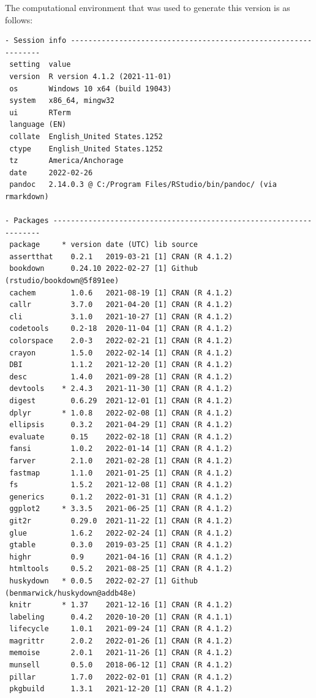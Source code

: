 \documentclass [11pt, proquest] {uwthesis}[2015/03/03]
\begin{document}
The computational environment that was used to generate this version is as follows:
\begin{verbatim}
- Session info ---------------------------------------------------------------
 setting  value
 version  R version 4.1.2 (2021-11-01)
 os       Windows 10 x64 (build 19043)
 system   x86_64, mingw32
 ui       RTerm
 language (EN)
 collate  English_United States.1252
 ctype    English_United States.1252
 tz       America/Anchorage
 date     2022-02-26
 pandoc   2.14.0.3 @ C:/Program Files/RStudio/bin/pandoc/ (via rmarkdown)

- Packages -------------------------------------------------------------------
 package     * version date (UTC) lib source
 assertthat    0.2.1   2019-03-21 [1] CRAN (R 4.1.2)
 bookdown      0.24.10 2022-02-27 [1] Github (rstudio/bookdown@5f891ee)
 cachem        1.0.6   2021-08-19 [1] CRAN (R 4.1.2)
 callr         3.7.0   2021-04-20 [1] CRAN (R 4.1.2)
 cli           3.1.0   2021-10-27 [1] CRAN (R 4.1.2)
 codetools     0.2-18  2020-11-04 [1] CRAN (R 4.1.2)
 colorspace    2.0-3   2022-02-21 [1] CRAN (R 4.1.2)
 crayon        1.5.0   2022-02-14 [1] CRAN (R 4.1.2)
 DBI           1.1.2   2021-12-20 [1] CRAN (R 4.1.2)
 desc          1.4.0   2021-09-28 [1] CRAN (R 4.1.2)
 devtools    * 2.4.3   2021-11-30 [1] CRAN (R 4.1.2)
 digest        0.6.29  2021-12-01 [1] CRAN (R 4.1.2)
 dplyr       * 1.0.8   2022-02-08 [1] CRAN (R 4.1.2)
 ellipsis      0.3.2   2021-04-29 [1] CRAN (R 4.1.2)
 evaluate      0.15    2022-02-18 [1] CRAN (R 4.1.2)
 fansi         1.0.2   2022-01-14 [1] CRAN (R 4.1.2)
 farver        2.1.0   2021-02-28 [1] CRAN (R 4.1.2)
 fastmap       1.1.0   2021-01-25 [1] CRAN (R 4.1.2)
 fs            1.5.2   2021-12-08 [1] CRAN (R 4.1.2)
 generics      0.1.2   2022-01-31 [1] CRAN (R 4.1.2)
 ggplot2     * 3.3.5   2021-06-25 [1] CRAN (R 4.1.2)
 git2r         0.29.0  2021-11-22 [1] CRAN (R 4.1.2)
 glue          1.6.2   2022-02-24 [1] CRAN (R 4.1.2)
 gtable        0.3.0   2019-03-25 [1] CRAN (R 4.1.2)
 highr         0.9     2021-04-16 [1] CRAN (R 4.1.2)
 htmltools     0.5.2   2021-08-25 [1] CRAN (R 4.1.2)
 huskydown   * 0.0.5   2022-02-27 [1] Github (benmarwick/huskydown@addb48e)
 knitr       * 1.37    2021-12-16 [1] CRAN (R 4.1.2)
 labeling      0.4.2   2020-10-20 [1] CRAN (R 4.1.1)
 lifecycle     1.0.1   2021-09-24 [1] CRAN (R 4.1.2)
 magrittr      2.0.2   2022-01-26 [1] CRAN (R 4.1.2)
 memoise       2.0.1   2021-11-26 [1] CRAN (R 4.1.2)
 munsell       0.5.0   2018-06-12 [1] CRAN (R 4.1.2)
 pillar        1.7.0   2022-02-01 [1] CRAN (R 4.1.2)
 pkgbuild      1.3.1   2021-12-20 [1] CRAN (R 4.1.2)

\end{verbatim}
\end{document}
